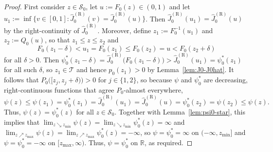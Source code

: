 \documentclass[a4paper]{article}
\newcommand{\R}{\mathbb{R}}
\theoremstyle{definition}
\begin{document}
\begin{proof}
First consider $z \in \mathcal{S}_0$, let $u := F_0(z) \in (0,1)$ and let $u_1 := \inf\bigl\{v \in [0,1] : \hat{J}_0^{(\mathrm{R})}(v) = \hat{J}_0^{(\mathrm{R})}(u)\bigr\}$. Then $\hat{J}_0^{(\mathrm{R})}(u_1) = \hat{J}_0^{(\mathrm{R})}(u)$ by the right-continuity of $\hat{J}_0^{(\mathrm{R})}$. Moreover, define $z_1 := F_0^{-1}(u_1)$ and $z_2 := Q_0(u)$, so that $z_1 \leq z \leq z_2$ and
\[
F_0(z_1 - \delta) < u_1 = F_0(z_1) \leq F_0(z_2) = u < F_0(z_2 + \delta)
\]
for all $\delta > 0$. Then $\psi_0^*(z_1 - \delta) = \hat{J}_0^{(\mathrm{R})}\bigl(F_0(z_1 - \delta)\bigr) > \hat{J}_0^{(\mathrm{R})}(u_1) = \psi_0^*(z_1)$ for all such $\delta$, so $z_1 \in \mathcal{T}$ and hence $p_0(z_1) > 0$ by Lemma~\ref{lem:J0-J0hat}. It follows that $P_0\bigl([z_j, z_j + \delta)\bigr) > 0$ for $j \in \{1,2\}$, so because $\psi$ and $\psi_0^*$ are decreasing, right-continuous functions that agree $P_0$-almost everywhere,
\[
\psi(z) \leq \psi(z_1) = \psi_0^*(z_1) = \hat{J}_0^{(\mathrm{R})}(u_1) = \hat{J}_0^{(\mathrm{R})}(u) = \psi_0^*(z_2) = \psi(z_2) \leq \psi(z).
\]
Thus, $\psi(z) = \psi_0^*(z)$ for all $z \in \mathcal{S}_0$. Together with Lemma~\ref{lem:psi0-star}, this implies that $\lim_{z \searrow z_{\min}} \psi(z) = \lim_{z \searrow z_{\min}}  \psi_0^*(z) = \infty$ and $\lim_{z \nearrow z_{\max}} \psi(z) = \lim_{z \nearrow z_{\max}}  \psi_0^*(z) = -\infty$, so $\psi = \psi_0^* = \infty$ on $(-\infty,z_{\min}]$ and $\psi = \psi_0^* = -\infty$ on $[z_{\max},\infty)$. Thus, $\psi = \psi_0^*$ on $\R$, as required.
\end{proof}
\end{document}
